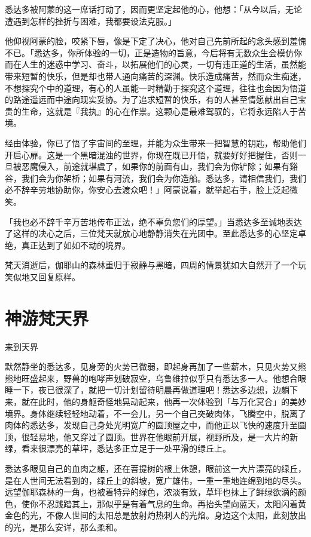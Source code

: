 \documentclass[12pt,twoside,openany]{book}
\begin{document}
悉达多被阿蒙的这一席话打动了，因而更坚定起他的心，他想：「从今以后，无论遭遇到怎样的挫折与困难，我都要设法克服。」

他仰视阿蒙的脸，咬紧下唇，像是下定了决心，他对自己先前所起的念头感到羞愧不已。「悉达多，你所体验的一切，正是造物的旨意，今后将有无数众生会模仿你而在人生的迷惑中学习、奋斗，以拓展他们的心灵，一切有违正道的生活，虽然能带来短暂的快乐，但是却也带人通向痛苦的深渊。快乐造成痛苦，然而众生痴迷，不想探究个中的道理，有心的人虽能一时精勤于探究这个道理，往往也会因为悟道的路途遥远而中途向现实妥协。为了追求短暂的快乐，有的人甚至情愿献出自己宝贵的生命，这就是『我执』的心在作祟。这颗心是最难驾驭的，它将永远陷人于苦境。

经由体验，你已了悟了宇宙间的至理，并能为众生带来一把智慧的钥匙，帮助他们开启心扉。这是一个黑暗混浊的世界，你现在既已开悟，就要好好把握住，否则一旦被恶魔侵入，前途就堪虞了，如果你的前面有山，我们会为你铲除；如果有谿谷，我们会为你架桥；如果有河流，我们会为你造船。悉达多，请相信我们，我们必不辞辛劳地协助你，你安心去渡众吧！」阿蒙说着，就举起右手，脸上泛起微笑。

「我也必不辞千辛万苦地传布正法，绝不辜负您们的厚望。」当悉达多至诚地表达了这样的决心之后，三位梵天就放心地静静消失在光团中。至此悉达多的心坚定卓绝，真正达到了如如不动的境界。

梵天消逝后，伽耶山的森林重归于寂静与黑暗，四周的情景犹如大自然开了一个玩笑似地又回复原样。

\section{神游梵天界}\label{sec1.18}

来到天界

默然静坐的悉达多，见身旁的火势已微弱，即起身再加了一些薪木，只见火势又熊熊地旺盛起来，野兽的咆哮声划破寂空，乌鲁维拉似乎只有悉达多一人。他想合眼睡一下，夜已很深了，就把一切计划留待明晨再做道理吧！悉达多边想，边躺下来，就在此时，他的身躯奇怪地晃动起来，他再一次体验到「与万化冥合」的美妙境界。身体继续轻轻地动着，不一会儿，另一个自己突破肉体，飞腾空中，脱离了肉体的悉达多，发现自己身处光明宽广的圆顶屋之中，而他正以飞快的速度升至圆顶，很轻易地，他又穿过了圆顶。世界在他眼前开展，视野所及，是一大片的新绿，看来很漂亮的草坪，悉达多正立足于一处平滑的绿丘上。

悉达多眼见自己的血肉之躯，还在菩提树的根上休憩，眼前这一大片漂亮的绿丘，是在人世间无法看到的，绿丘上的斜坡，宽广雄伟，一重一重地连绵到地的尽头。远望伽耶森林的一角，也被着特异的绿色，浓淡有致，草坪也抹上了鲜绿欲滴的颜色，使你不忍践踏其上，那似乎是有着气息的生命。再抬头望向蓝天，太阳闪着黄金色的光，不像人世间的太阳总是放射灼热刺人的光焰。身边这个太阳，此刻放出的光，是那么安详，那么柔和。
\end{document}
